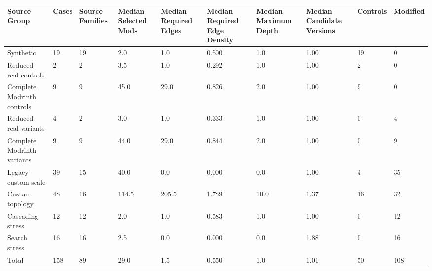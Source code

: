 \begin{tabularx}{\linewidth}{@{}lXXXXXXXXX@{}}
\hline
Source Group & Cases & Source Families & Median Selected Mods & Median Required Edges & Median Required Edge Density & Median Maximum Depth & Median Candidate Versions & Controls & Modified \\
\hline
Synthetic & 19 & 19 & 2.0 & 1.0 & 0.500 & 1.0 & 1.00 & 19 & 0 \\
Reduced real controls & 2 & 2 & 3.5 & 1.0 & 0.292 & 1.0 & 1.00 & 2 & 0 \\
Complete Modrinth controls & 9 & 9 & 45.0 & 29.0 & 0.826 & 2.0 & 1.00 & 9 & 0 \\
Reduced real variants & 4 & 2 & 3.0 & 1.0 & 0.333 & 1.0 & 1.00 & 0 & 4 \\
Complete Modrinth variants & 9 & 9 & 44.0 & 29.0 & 0.844 & 2.0 & 1.00 & 0 & 9 \\
Legacy custom scale & 39 & 15 & 40.0 & 0.0 & 0.000 & 0.0 & 1.00 & 4 & 35 \\
Custom topology & 48 & 16 & 114.5 & 205.5 & 1.789 & 10.0 & 1.37 & 16 & 32 \\
Cascading stress & 12 & 12 & 2.0 & 1.0 & 0.583 & 1.0 & 1.00 & 0 & 12 \\
Search stress & 16 & 16 & 2.5 & 0.0 & 0.000 & 0.0 & 1.88 & 0 & 16 \\
Total & 158 & 89 & 29.0 & 1.5 & 0.550 & 1.0 & 1.01 & 50 & 108 \\
\hline
\end{tabularx}
